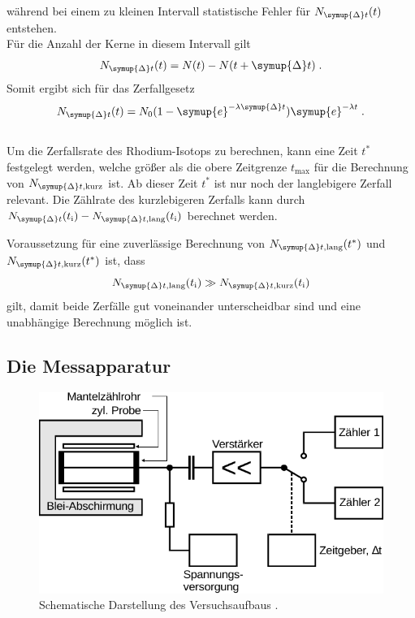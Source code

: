     während bei einem zu kleinen Intervall statistische Fehler für $N_{\symup{\Delta}t}(t)$ entstehen.\\
    Für die Anzahl der Kerne in diesem Intervall gilt
    \begin{equation*}
        N_{\symup{\Delta}t}(t) = N(t) - N(t + \symup{\Delta} t) \; .
    \end{equation*}
    Somit ergibt sich für das Zerfallgesetz
    \begin{equation*}
        N_{\symup{\Delta}t}(t) = N_0 (1 - \symup{e}^{-\lambda \symup{\Delta}t}) \symup{e}^{-\lambda t} \; .
    \end{equation*}
    \\
    Um die Zerfallsrate des Rhodium-Isotops zu berechnen,
    kann eine Zeit $t^*$ festgelegt werden,
    welche größer als die obere Zeitgrenze $t_\text{max}$ für die Berechnung von $N_{\symup{\Delta}t, \text{kurz}}$ ist.
    Ab dieser Zeit $t^*$ ist nur noch der langlebigere Zerfall relevant.
    Die Zählrate des kurzlebigeren Zerfalls kann durch $N_{\symup{\Delta}t} (t_\text{i}) - N_{\symup{\Delta}t, \text{lang}} (t_\text{i})$ berechnet werden.

    Voraussetzung für eine zuverlässige Berechnung von
    $N_{\symup{\Delta}t, \text{lang}} (t^*)$
    und $N_{\symup{\Delta}t, \text{kurz}} (t^*)$
    ist, dass
    \begin{equation*}
        N_{\symup{\Delta}t, \text{lang}} (t_\text{i}) \gg N_{\symup{\Delta}t, \text{kurz}} (t_\text{i})
    \end{equation*}
    gilt,
    damit beide Zerfälle gut voneinander unterscheidbar sind
    und eine unabhängige Berechnung möglich ist.

\subsection{Die Messapparatur}

    \begin{figure}[H]
      \centering
      \includegraphics[width=\textwidth]{content/img/Abb_3.pdf}
      \caption{Schematische Darstellung des Versuchsaufbaus \cite{versuchsanleitung}.}
      \label{fig:gmz}
    \end{figure}

